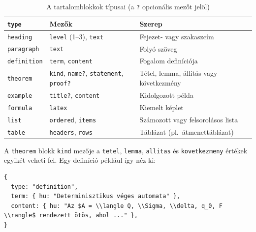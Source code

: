 \documentclass[12pt,a4paper]{report}
\begin{document}
\begin{table}[htbp]
    \centering
    \begin{tabularx}{\textwidth}{l p{4.6cm} X}
        \toprule
        \textbf{\texttt{type}} & \textbf{Mezők} & \textbf{Szerep} \\
        \midrule
        \texttt{heading}    & \texttt{level} (1--3), \texttt{text}
                            & Fejezet- vagy szakaszcím \\
        \texttt{paragraph}  & \texttt{text}
                            & Folyó szöveg \\
        \texttt{definition} & \texttt{term}, \texttt{content}
                            & Fogalom definíciója \\
        \texttt{theorem}    & \texttt{kind}, \texttt{name?},
                              \texttt{statement}, \texttt{proof?}
                            & Tétel, lemma, állítás vagy következmény \\
        \texttt{example}    & \texttt{title?}, \texttt{content}
                            & Kidolgozott példa \\
        \texttt{formula}    & \texttt{latex}
                            & Kiemelt képlet \\
        \texttt{list}       & \texttt{ordered}, \texttt{items}
                            & Számozott vagy felsorolásos lista \\
        \texttt{table}      & \texttt{headers}, \texttt{rows}
                            & Táblázat (pl.\ átmenettáblázat) \\
        \bottomrule
    \end{tabularx}
    \caption{A tartalomblokkok típusai (a \texttt{?} opcionális mezőt jelöl)}
    \label{tab:blocks}
\end{table}

A \texttt{theorem} blokk \texttt{kind} mezője a
\texttt{tetel}, \texttt{lemma}, \texttt{allitas} és
\texttt{kovetkezmeny} értékek egyikét veheti fel. Egy definíció például
így néz ki:

\begin{lstlisting}
{
  type: "definition",
  term: { hu: "Determinisztikus véges automata" },
  content: { hu: "Az $A = \\langle Q, \\Sigma, \\delta, q_0, F \\rangle$ rendezett ötös, ahol ..." },
}
\end{lstlisting}
\end{document}
